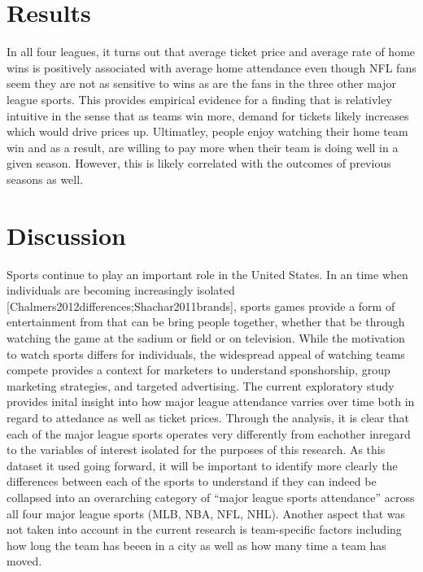 \documentclass[man, fleqn, noextraspace,floatsintext]{apa6}
\begin{document}
\section{Results}\label{results}

In all four leagues, it turns out that average ticket price and average
rate of home wins is positively associated with average home attendance
even though NFL fans seem they are not as sensitive to wins as are the
fans in the three other major league sports. This provides empirical
evidence for a finding that is relativley intuitive in the sense that as
teams win more, demand for tickets likely increases which would drive
prices up. Ultimatley, people enjoy watching their home team win and as
a result, are willing to pay more when their team is doing well in a
given season. However, this is likely correlated with the outcomes of
previous seasons as well.

\section{Discussion}\label{discussion}

Sports continue to play an important role in the United States. In an
time when individuals are becoming increasingly isolated
{[}Chalmers2012differences;Shachar2011brands{]}, sports games provide a
form of entertainment from that can be bring people together, whether
that be through watching the game at the sadium or field or on
television. While the motivation to watch sports differs for
individuals, the widespread appeal of watching teams compete provides a
context for marketers to understand sponshorship, group marketing
strategies, and targeted advertising. The current exploratory study
provides inital insight into how major league attendance varries over
time both in regard to attedance as well as ticket prices. Through the
analysis, it is clear that each of the major league sports operates very
differently from eachother inregard to the variables of interest
isolated for the purposes of this research. As this dataset it used
going forward, it will be important to identify more clearly the
differences between each of the sports to understand if they can indeed
be collapsed into an overarching category of \enquote{major league
sports attendance} across all four major league sports (MLB, NBA, NFL,
NHL). Another aspect that was not taken into account in the current
research is team-specific factors including how long the team has beeen
in a city as well as how many time a team has moved.
\end{document}
